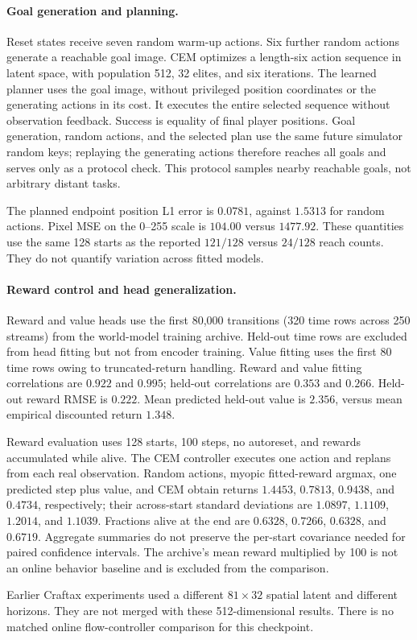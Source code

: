 \paragraph{Goal generation and planning.}
Reset states receive seven random warm-up actions. Six further random actions generate a reachable
goal image. CEM optimizes a length-six action sequence in latent space, with population 512,
32 elites, and six iterations. The learned planner uses the goal image, without privileged position
coordinates or the generating actions in its cost. It executes the entire selected sequence without
observation feedback. Success is equality of final player positions. Goal generation, random actions,
and the selected plan use the same future simulator random keys; replaying the generating actions
therefore reaches all goals and serves only as a protocol check. This protocol samples nearby
reachable goals, not arbitrary distant tasks.

The planned endpoint position L1 error is $0.0781$, against $1.5313$ for random actions. Pixel MSE
on the 0--255 scale is $104.00$ versus $1477.92$. These quantities use the same 128 starts as the
reported $121/128$ versus $24/128$ reach counts. They do not quantify variation across fitted models.

\paragraph{Reward control and head generalization.}
Reward and value heads use the first 80,000 transitions (320 time rows across 250 streams) from the
world-model training archive. Held-out time rows are excluded from head fitting but not from encoder
training. Value fitting uses the first 80 time rows owing to truncated-return handling. Reward and
value fitting correlations are $0.922$ and $0.995$; held-out correlations are $0.353$ and $0.266$.
Held-out reward RMSE is $0.222$. Mean predicted held-out value is $2.356$, versus mean empirical
discounted return $1.348$.

Reward evaluation uses 128 starts, 100 steps, no autoreset, and rewards accumulated while alive.
The CEM controller executes one action and replans from each real observation. Random actions,
myopic fitted-reward argmax, one predicted step plus value, and CEM obtain returns
$1.4453$, $0.7813$, $0.9438$, and $0.4734$, respectively; their across-start standard deviations
are $1.0897$, $1.1109$, $1.2014$, and $1.1039$. Fractions alive at the end are $0.6328$, $0.7266$,
$0.6328$, and $0.6719$. Aggregate summaries do not preserve the per-start covariance needed for
paired confidence intervals. The archive's mean reward multiplied by 100 is not an online behavior
baseline and is excluded from the comparison.

Earlier Craftax experiments used a different $81\times32$ spatial latent and different horizons.
They are not merged with these 512-dimensional results. There is no matched online flow-controller
comparison for this checkpoint.
